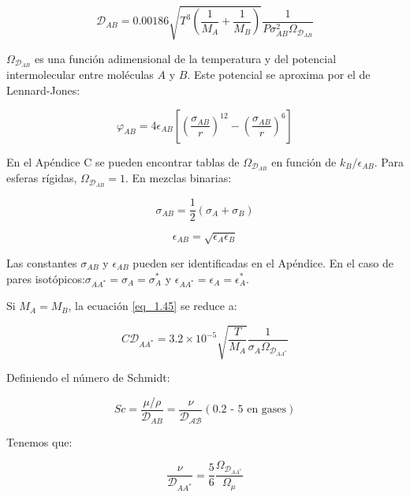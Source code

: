 \begin{equation}
\mathscr{D}_{AB} = 0.00186 \sqrt{T^3(\frac{1}{M_A}+\frac{1}{M_B})}\frac{1}{P \sigma_{AB}^2 \Omega_{\mathscr{D}_{AB}}}  \tag{1.46}\label{eq_1.46}
\end{equation}

\(\Omega_{\mathscr{D}_{AB}}\) es una función adimensional de la temperatura y del potencial intermolecular entre moléculas \( A \) y \( B \). Este potencial se aproxima por el de Lennard-Jones:

\begin{equation}
\varphi_{AB}=4 \epsilon_{AB}[(\frac{\sigma_{AB}}{r})^{12}-(\frac{\sigma_{AB}}{r})^6]  \tag{1.47}\label{eq_1.47}
\end{equation}

En el Apéndice C se pueden encontrar tablas de \( \Omega_{\mathscr{D}_{AB}} \) en función de \( k_B / \epsilon_{AB} \). Para esferas rígidas, \( \Omega_{\mathscr{D}_{AB}} = 1 \). En mezclas binarias:

\begin{equation}
\sigma_{AB} = \frac{1}{2} (\sigma_A+\sigma_B)\tag{1.48}\label{eq_1.48}
\end{equation}

\begin{equation}
\epsilon_{AB} = \sqrt{\epsilon_A \epsilon_B}\tag{1.49}\label{eq_1.49}
\end{equation}

Las constantes $\sigma_{AB}$ y \( \epsilon_{AB} \) pueden ser identificadas en el Apéndice. En el caso de pares isotópicos:$\sigma_{AA^*}=\sigma_A=\sigma_A^*$  y  $\epsilon_{AA^*}=\epsilon_A=\epsilon_A^*$.




Si \( M_A = M_B \), la ecuación \ref{eq_1.45} se reduce a:

\begin{equation}
C\mathscr{D}_{AA^*} = 3.2 \times 10^{-5}\sqrt{\frac{T}{M_A}} \frac{1}{\sigma_A \Omega_{\mathscr{D}_{AA^*}}} \tag{1.50}\label{eq_1.50}
\end{equation}

Definiendo el número de Schmidt:

\begin{equation}
Sc = \frac{\mu / \rho}{\mathscr{D}_{AB}} = \frac{\nu}{\mathscr{D_{AB}}} (\text{0.2 - 5 en gases}) \tag{1.51}\label{eq_1.51}
\end{equation}

Tenemos que:

\begin{equation}
\frac{\nu}{\mathscr{D}_{AA^*}} = \frac{5}{6}\frac{\Omega_{\mathscr{D}_{AA^*}}}{ \Omega_\mu}\tag{1.52}\label{eq_1.52}
\end{equation}


